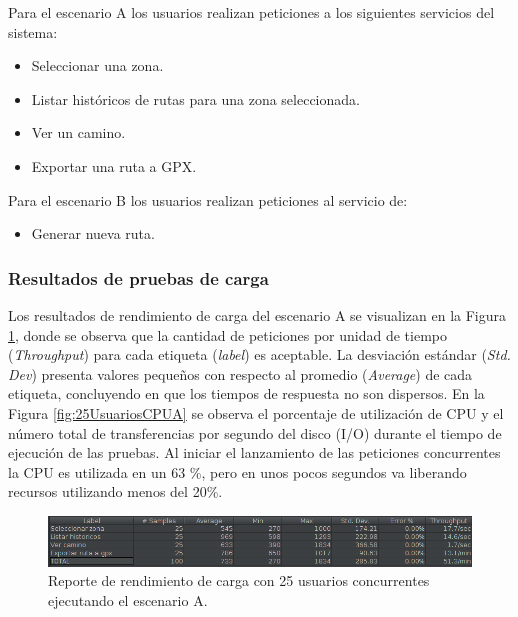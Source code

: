 Para el escenario A los usuarios realizan peticiones a los siguientes servicios del sistema:
\begin{itemize}
    \item Seleccionar una zona.
    \item Listar históricos de rutas para una zona seleccionada.
    \item Ver un camino.
    \item Exportar una ruta a GPX.
\end{itemize}

Para el escenario B los usuarios realizan peticiones al servicio de:
\begin{itemize}
    \item Generar nueva ruta.
\end{itemize}

\subsubsection{Resultados de pruebas de carga}
\label{ref:resultadosPruebaCarga}

Los resultados de rendimiento de carga del escenario A se visualizan en la Figura \ref{fig:25UsuariosCargaA}, donde se observa que la cantidad de peticiones por unidad de tiempo (\textit{Throughput}) para cada etiqueta (\textit{label}) es aceptable. La desviación estándar (\textit{Std. Dev}) presenta valores pequeños con respecto al promedio (\textit{Average}) de cada etiqueta, concluyendo en que los tiempos de respuesta no son dispersos. En la Figura \ref{fig:25UsuariosCPUA} se observa el porcentaje de utilización de CPU y el número total de transferencias por segundo del disco (I/O) durante el tiempo de ejecución de las pruebas. Al iniciar el lanzamiento de las peticiones concurrentes la CPU es utilizada en un 63 \%, pero en unos pocos segundos va liberando recursos utilizando menos del 20\%.


\begin{figure}[H]
    \centering
    \includegraphics[width=\textwidth]{25_usuarios_editado_.png}
    \caption{Reporte de rendimiento de carga con 25 usuarios concurrentes ejecutando el escenario A.}
    \label{fig:25UsuariosCargaA}
\end{figure}

